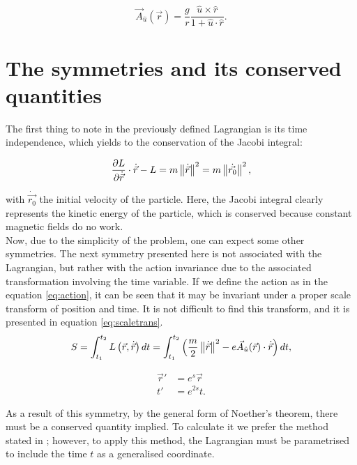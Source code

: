 \begin{equation}
\vec{A}_{\hat{u}}(\vec{r}) = \frac{g}{r}\frac{\hat{u}\times\hat{r}}{1+\hat{u}\cdot\hat{r}}.
\label{eq:monopolepotential}
\end{equation}

\section{The symmetries and its conserved quantities}
The first thing to note in the previously defined Lagrangian is its time independence, which yields to the conservation of the Jacobi integral:

\begin{equation*}
 \frac{\partial L}{\partial\dot{\vec{r}}}\cdot\dot{\vec{r}} - L = m\left\lVert \dot{\vec{r}} \right\rVert^2                    =m\left\lVert \dot{\vec{r_0}} \right\rVert^2 ,
\end{equation*}

with $\dot{\vec{r_0}}$ the initial velocity of the particle. Here, the Jacobi integral clearly represents the kinetic energy of the particle, which is conserved because constant magnetic fields do no work.\\

Now, due to the simplicity of the problem, one can expect some other symmetries. The next symmetry presented here is not associated with the Lagrangian, but rather with the action invariance due to the associated transformation involving the time variable. If we define the action as in the equation \eqref{eq:action}, it can be seen that it may be invariant under a proper scale transform of position and time. It is not difficult to find this transform, and it is presented in equation \eqref{eq:scaletrans}.\\

\begin{equation}
S = \int_{t_1}^{t_2}L\left( \vec{r},\dot{\vec{r}} \right)dt = \int_{t_1}^{t_2}\left( \frac{m}{2}\left\lVert \dot{\vec{r}} \right\rVert^2 - e\vec{A}_{\hat{u}}(\vec{r})\cdot\dot{\vec{r}} \right)dt,
\label{eq:action}
\end{equation}

\begin{equation}
\begin{aligned}
\vec{r}' &= e^{s}\vec{r}\\
t'&= e^{2s}t.
\end{aligned}
\label{eq:scaletrans}
\end{equation}

As a result of this symmetry, by the general form of Noether's theorem, there must be a conserved quantity implied. To calculate it we prefer the method stated in \cite[2.19 Noether's Thm]{scheck}; however, to apply this method, the Lagrangian must be parametrised to include the time $t$ as a generalised coordinate.\\

